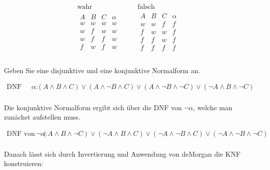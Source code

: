 \documentclass[main.tex]{subfiles}
\begin{document}
\begin{equation*}
\begin{array}{lcl}
    \text{wahr} & & \text{falsch} \\
    \begin{array}{d|d|d|h}
        A & B & C & \alpha \\
        \hline
        w & w & w  & w \\
        w & f & w  & w \\
        w & f & f  & w \\
        f & w & f  & w \\
    \end{array}
    & \quad &
    \begin{array}{d|d|d|h}
        A & B & C & \alpha \\
        \hline
        w & w & f  & f \\
        f & w & w  & f \\
        f & f & w  & f \\
        f & f & f  & f \\
    \end{array}
\end{array}
\end{equation*}
\\[4mm]

Geben Sie eine disjunktive und eine konjunktive Normalform an.

\begin{equation*}
    \begin{aligned}
        \text{DNF von } \alpha: & (A \land B \land C) \lor (A \land \lnot B \land C) \lor (A \land \lnot B \land \lnot C) \lor (\lnot A \land B \land \lnot C)\\
    \end{aligned}
\end{equation*}

Die konjunktive Normalform ergibt sich über die DNF von $\lnot \alpha$, welche man zunächst aufstellen muss. 

\begin{equation*}
    \begin{aligned}
        \text{DNF von } \lnot \alpha: & (A \land B \land \lnot C) \lor (\lnot A \land B \land C) \lor (\lnot A \land \lnot B \land C) \lor (\lnot A \land \lnot B \land \lnot C)\\
    \end{aligned}
\end{equation*}

Danach lässt sich durch Invertierung und Anwendung von deMorgan die KNF konstruieren:
\end{document}
